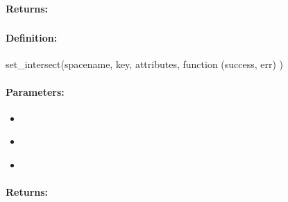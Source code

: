 \paragraph{Returns:}


\pagebreak
\subsubsection{}
\label{api:nodejs:set_intersect}


\paragraph{Definition:}
\begin{javascriptcode}
set_intersect(spacename, key, attributes, function (success, err) {})
\end{javascriptcode}
\paragraph{Parameters:}
\begin{itemize}[noitemsep]
\item {}\\

\item {}\\

\item {}\\

\end{itemize}

\paragraph{Returns:}


\pagebreak
\subsubsection{}
\label{api:nodejs:cond_set_intersect}


